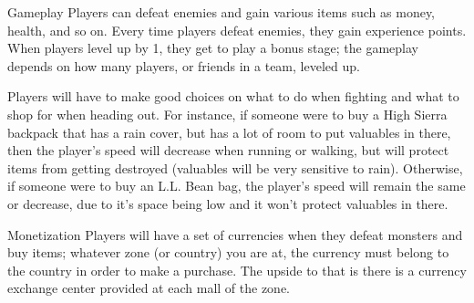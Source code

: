 \documentclass[12pt]{beamer}
\begin{document}
\begin{frame}{Gameplay}
	Players can defeat enemies and gain various items such as money, health, and so on. Every time players defeat enemies, they gain experience points. When players level up by 1, they get to play a bonus stage; the gameplay depends on how many players, or friends in a team, leveled up. \newline

	Players will have to make good choices on what to do when fighting and what to shop for when heading out. For instance, if someone were to buy a High Sierra backpack that has a rain cover, but has a lot of room to put valuables in there, then the player's speed will decrease when running or walking, but will protect items from getting destroyed (valuables will be very sensitive to rain). Otherwise, if someone were to buy an L.L. Bean bag, the player's speed will remain the same or decrease, due to it's space being low and it won't protect valuables in there.
\end{frame}

\begin{frame}{Monetization}
	Players will have a set of currencies when they defeat monsters and buy items; whatever zone (or country) you are at, the currency must belong to the country in order to make a purchase. The upside to that is there is a currency exchange center provided at each mall of the zone.
\end{frame}
\end{document}
